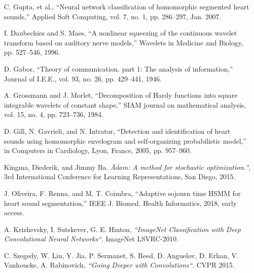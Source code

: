\begin{thebibliography}{9}
C. Gupta, et al., “Neural network classification of homomorphic
segmented heart sounds,” Applied Soft Computing, vol. 7, no. 1, pp.
286–297, Jan. 2007.

I. Daubechies and S. Maes, “A nonlinear squeezing of the continuous wavelet transform based on auditory nerve models,” Wavelets in Medicine and Biology, pp. 527–546, 1996.

D. Gabor, “Theory of communication. part 1: The analysis of information,” Journal of I.E.E., vol. 93, no. 26, pp. 429–441, 1946.

A. Grossmann and J. Morlet, “Decomposition of Hardy functions into square integrable wavelets of constant shape,” SIAM journal on mathematical analysis, vol. 15, no. 4, pp. 723–736, 1984.

D. Gill, N. Gavrieli, and N. Intrator, “Detection and identification of heart sounds using homomorphic envelogram and self-organizing probabilistic model,” in Computers in Cardiology, Lyon, France, 2005, pp. 957–960.

Kingma, Diederik, and Jimmy Ba. \textit{\" Adam: A method for stochastic optimization."}, 3rd International Conference for Learning Representations, San Diego, 2015.

J. Oliveira, F. Renna, and M. T. Coimbra, “Adaptive sojourn time HSMM for heart sound segmentation,” IEEE J. Biomed. Health Informatics, 2018, early access.

A. Krizhevsky, I. Sutskever, G. E. Hinton, \textit{``ImageNet Classification with Deep Convolutional
Neural Networks``}. ImageNet LSVRC-2010.

C. Szegedy, W. Liu, Y. Jia, P. Sermanet, S. Reed, D. Anguelov, D. Erhan, V. Vanhoucke, A. Rabinovich, \textit{``Going Deeper with Convolutions``}. CVPR 2015.

\end{thebibliography}